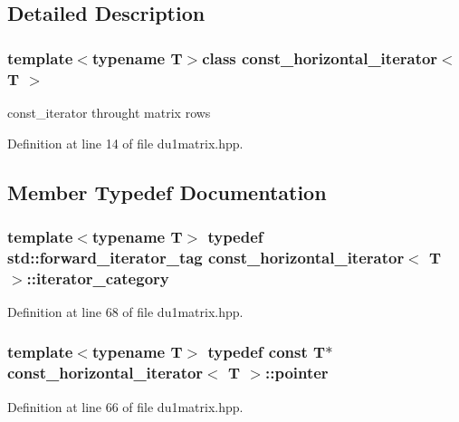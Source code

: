 \subsection{Detailed Description}
\subsubsection*{template$<$typename T$>$class const\-\_\-horizontal\-\_\-iterator$<$ T $>$}

const\-\_\-iterator throught matrix rows 

Definition at line 14 of file du1matrix.\-hpp.



\subsection{Member Typedef Documentation}
\hypertarget{classconst__horizontal__iterator_a4ad9daf1ad6ddc77fa10f3a5ad155919}{
\subsubsection[{iterator\-\_\-category}]{\setlength{\rightskip}{0pt plus 5cm}template$<$typename T$>$ typedef std\-::forward\-\_\-iterator\-\_\-tag {\bf const\-\_\-horizontal\-\_\-iterator}$<$ T $>$\-::{\bf iterator\-\_\-category}}}\label{classconst__horizontal__iterator_a4ad9daf1ad6ddc77fa10f3a5ad155919}


Definition at line 68 of file du1matrix.\-hpp.

\hypertarget{classconst__horizontal__iterator_a44794e7f9d7ca88a648604b53ee343e4}{
\subsubsection[{pointer}]{\setlength{\rightskip}{0pt plus 5cm}template$<$typename T$>$ typedef const T$\ast$ {\bf const\-\_\-horizontal\-\_\-iterator}$<$ T $>$\-::{\bf pointer}}}\label{classconst__horizontal__iterator_a44794e7f9d7ca88a648604b53ee343e4}


Definition at line 66 of file du1matrix.\-hpp.

